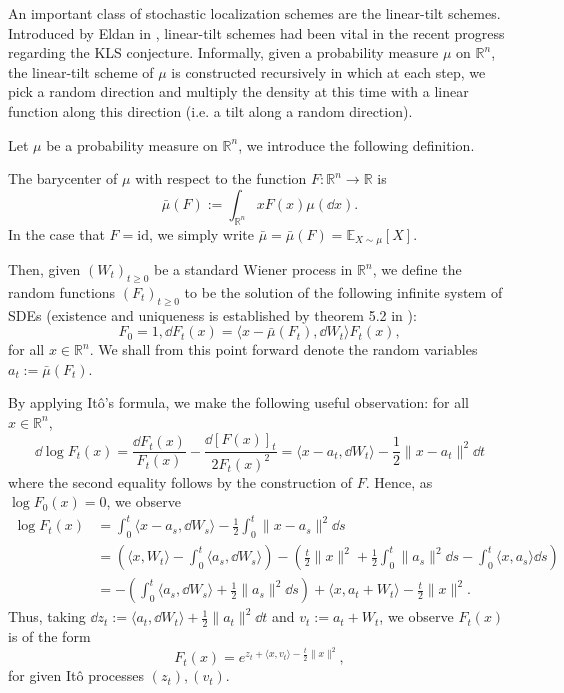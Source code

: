 An important class of stochastic localization schemes are the linear-tilt schemes. Introduced by Eldan 
in \cite{Eldan_2013}, linear-tilt schemes had been vital in the recent progress regarding the KLS 
conjecture. Informally, given a probability measure \(\mu\) on \(\mathbb{R}^n\), the linear-tilt scheme
of \(\mu\) is constructed recursively in which at each step, we pick a random direction and multiply 
the density at this time with a linear function along this direction (i.e. a tilt along a random 
direction). 

Let \(\mu\) be a probability measure on \(\mathbb{R}^n\), we introduce the following definition.
\begin{definition}[Barycenter]
  The barycenter of \(\mu\) with respect to the function \(F : \mathbb{R}^n \to \mathbb{R}\) is
  \[\bar{\mu}(F) := \int_{\mathbb{R}^n} x F(x) \mu(\dd x).\]
  In the case that \(F = \text{id}\), we simply write \(\bar{\mu} = \bar{\mu}(F) = \mathbb{E}_{X \sim \mu}[X]\).
\end{definition}

Then, given \((W_t)_{t \ge 0}\) be a standard Wiener process in \(\mathbb{R}^n\), we define the random functions 
\((F_t)_{t \ge 0}\) to be the solution of the following infinite system of SDEs 
(existence and uniqueness is established by theorem 5.2 in \cite{Øksendal_2003}): 
\begin{equation}\label{eq:stoch_loc}
  F_0 = 1, \dd F_t(x) = \langle x - \bar{\mu}(F_t), \dd W_t \rangle F_t(x),
\end{equation}
for all \(x \in \mathbb{R}^n\). We shall from this point forward denote the random variables 
\(a_t := \bar{\mu}(F_t)\).

By applying Itô's formula, we make the following useful observation: for all \(x \in \mathbb{R}^n\),
\begin{equation}
  \dd \log F_t(x) = \frac{\dd F_t(x)}{F_t(x)} - \frac{\dd\hspace{0pt} [F(x)]_t}{2F_t(x)^2} 
    = \langle x - a_t, \dd W_t \rangle - \frac{1}{2}\|x - a_t\|^2 \dd t
\end{equation}
where the second equality follows by the construction of \(F\). Hence, as \(\log F_0(x) = 0\), we 
observe
\begin{align*}
  \log F_t(x) & = \int_0^t \langle x - a_s, \dd W_s \rangle - \frac{1}{2}\int_0^t \|x - a_s\|^2 \dd s\\
    & = \left(\langle x, W_t \rangle - \int_0^t \langle a_s, \dd W_s \rangle\right)
      - \left(\frac{t}{2}\|x\|^2 + \frac{1}{2}\int_0^t\|a_s\|^2 \dd s - \int_0^t \langle x, a_s \rangle \dd s\right)\\
    & = - \left(\int_0^t \langle a_s, \dd W_s \rangle + \frac{1}{2}\|a_s\|^2 \dd s\right) + 
      \langle x, a_t + W_t \rangle - \frac{t}{2}\|x\|^2.
\end{align*}
Thus, taking \(\dd z_t := \langle a_t, \dd W_t\rangle + \frac{1}{2} \|a_t\|^2 \dd t\) and 
\(v_t := a_t + W_t\), we observe \(F_t(x)\) is of the form
\begin{equation}\label{eq:stoch_loc_alt}
  F_t(x) = e^{z_t + \langle x, v_t \rangle - \frac{t}{2}\|x\|^2},
\end{equation}
for given Itô processes \((z_t), (v_t)\).

